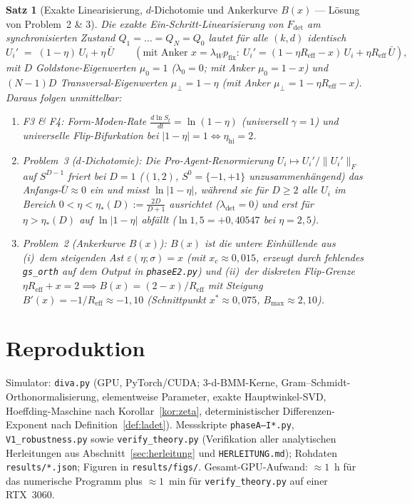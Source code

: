 \documentclass[11pt,a4paper]{article}
\newtheorem{satz}{Satz}
\theoremstyle{remark}
\begin{document}
\begin{satz}[Exakte Linearisierung, $d$-Dichotomie und Ankerkurve $B(x)$ --- Lösung von Problem~2 \& 3]\label{thm:lin}
Die exakte Ein-Schritt-Linearisierung von $F_{\mathrm{det}}$ am synchronisierten
Zustand $Q_1=\dots=Q_N=Q_0$ lautet für alle $(k,d)$ identisch
\begin{equation}\label{eq:linmap}
U_i'\;=\;(1-\eta)\,U_i+\eta\,\bar U
\qquad(\text{mit Anker } x=\lambda_W p_{\mathrm{fix}}:\ U_i'=(1-\eta R_{\mathrm{eff}}-x)\,U_i+\eta R_{\mathrm{eff}}\,\bar U),
\end{equation}
mit $D$ Goldstone-Eigenwerten $\mu_0=1$ ($\lambda_0=0$; mit Anker $\mu_0=1-x$)
und $(N-1)D$ Transversal-Eigenwerten $\mu_\perp=1-\eta$ (mit Anker
$\mu_\perp=1-\eta R_{\mathrm{eff}}-x$). Daraus folgen unmittelbar:
\begin{enumerate}
\item \emph{F3 \& F4:} Form-Moden-Rate $\frac{d\ln S_t}{dt}=\ln(1-\eta)$
(universell $\gamma=1$) und universelle Flip-Bifurkation bei $|1-\eta|=1\iff\eta_{\mathrm{hi}}=2$.
\item \emph{Problem~3 ($d$-Dichotomie):} Die Pro-Agent-Renormierung
$U_i\mapsto U_i'/\|U_i'\|_F$ auf $S^{D-1}$ friert bei $D=1$ ($(1,2)$,
$S^0=\{-1,+1\}$ unzusammenhängend) das Anfangs-$\bar U\approx0$ ein und misst
$\ln|1-\eta|$, während sie für $D\ge2$ alle $U_i$ im Bereich
$0<\eta<\eta_\ast(D):=\frac{2D}{D+1}$ ausrichtet ($\lambda_{\mathrm{det}}=0$)
und erst für $\eta>\eta_\ast(D)$ auf $\ln|1-\eta|$ abfällt ($\ln 1{,}5=+0{,}40547$
bei $\eta=2{,}5$).
\item \emph{Problem~2 (Ankerkurve $B(x)$):} $B(x)$ ist die untere Einhüllende aus
(i)~dem steigenden Ast $\varepsilon(\eta;\sigma)=x$ (mit $x_c\approx0{,}015$,
erzeugt durch fehlendes \texttt{gs\_orth} auf dem Output in \texttt{phaseE2.py})
und (ii)~der diskreten Flip-Grenze $\eta R_{\mathrm{eff}}+x=2\implies
B(x)=(2-x)/R_{\mathrm{eff}}$ mit Steigung $B'(x)=-1/R_{\mathrm{eff}}\approx-1{,}10$
(Schnittpunkt $x^\ast\approx0{,}075$, $B_{\max}\approx2{,}10$).
\end{enumerate}
\end{satz}

\section{Reproduktion}

Simulator: \texttt{diva.py} (GPU, PyTorch/CUDA; 3-d-BMM-Kerne,
Gram--Schmidt-Orthonormalisierung, elementweise Parameter, exakte
Hauptwinkel-SVD, Hoeffding-Maschine nach Korollar~\ref{kor:zeta},
deterministischer Differenzen-Exponent nach
Definition~\ref{def:ladet}). Messskripte \texttt{phaseA--I*.py},
\texttt{V1\_robustness.py} sowie \texttt{verify\_theory.py} (Verifikation aller
analytischen Herleitungen aus Abschnitt~\ref{sec:herleitung} und
\texttt{HERLEITUNG.md}); Rohdaten \texttt{results/*.json}; Figuren in
\texttt{results/figs/}. Gesamt-GPU-Aufwand: $\approx1$~h für das numerische
Programm plus $\approx1$~min für \texttt{verify\_theory.py} auf einer RTX~3060.
\end{document}
